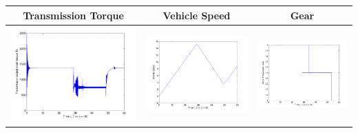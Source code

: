 \documentclass{seminar}
\begin{document}
\begin{slide}
\begin{tabular}{ccc}
Transmission Torque & Vehicle Speed & Gear
\\ \hline
\includegraphics[angle=0,scale=0.22]{Ts-tps80-grade2} &
\includegraphics[angle=0,scale=0.22]{V-tps80-grade2} &
\includegraphics[angle=0,scale=0.22]{Gear-tps80-grade2} 
\end{tabular}


\end{slide}
\end{document}
